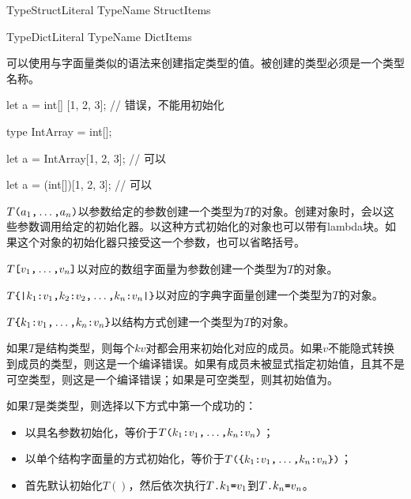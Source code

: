 \begin{bnf}{TypeStructLiteral}
    TypeName \terminal{\{} StructItems\bnfq \terminal{\}}
\end{bnf}

\begin{bnf}{TypeDictLiteral}
    TypeName \terminal{\{|} DictItems\bnfq \terminal{|\}}
\end{bnf}

\pnum
可以使用与字面量类似的语法来创建指定类型的值。被创建的类型必须是一个类型名称。

\enterexample
\begin{codeblock}

let a = int[] [1, 2, 3]; // 错误，不能用\tcode{[]}初始化

type IntArray = int[];

let a = IntArray[1, 2, 3]; // 可以

let a = (int[])[1, 2, 3]; // 可以

\end{codeblock}
\exitexample

\pnum
$T\texttt{(}a_1\texttt{,}\ldots\texttt{,}a_n\texttt{)}$以参数给定的参数创建一个类型为$T$的对象。创建对象时，会以这些参数调用给定的初始化器。以这种方式初始化的对象也可以带有lambda块。如果这个对象的初始化器只接受这一个参数，也可以省略括号。

\pnum
$T\texttt{[}v_1\texttt{,}\ldots\texttt{,}v_n\texttt{]}$以对应的数组字面量为参数创建一个类型为$T$的对象。

\pnum
$T\texttt{\{|}k_1\texttt{:} v_1\texttt{,} k_2\texttt{:} v_2\texttt{,} \ldots\texttt{,} k_n\texttt{:} v_n\texttt{|\}}$以对应的字典字面量创建一个类型为$T$的对象。

\pnum
$T\texttt{\{}k_1\texttt{:}v_1\texttt{,}\ldots\texttt{,}k_n\texttt{:}v_n\texttt{\}}$以结构方式创建一个类型为$T$的对象。

\pnum
如果$T$是结构类型，则每个$kv$对都会用来初始化对应的成员。如果$v$不能隐式转换到成员的类型，则这是一个编译错误。如果有成员未被显式指定初始值，且其不是可空类型，则这是一个编译错误；如果是可空类型，则其初始值为。

\pnum
如果$T$是类类型，则选择以下方式中第一个成功的：

\begin{itemize}
    \item 以具名参数初始化，等价于$T\texttt{(}k_1\texttt{:}v_1\texttt{,}\ldots\texttt{,}k_n\texttt{:}v_n\texttt{)}$；
    \item 以单个结构字面量的方式初始化，等价于$T\texttt{(\{}k_1\texttt{:}v_1\texttt{,}\ldots\texttt{,}k_n\texttt{:}v_n\texttt{\})}$；
    \item 首先默认初始化$T()$，然后依次执行$T\texttt{.}k_1\texttt{=}v_1$到$T\texttt{.}k_n\texttt{=}v_n$。
\end{itemize}

